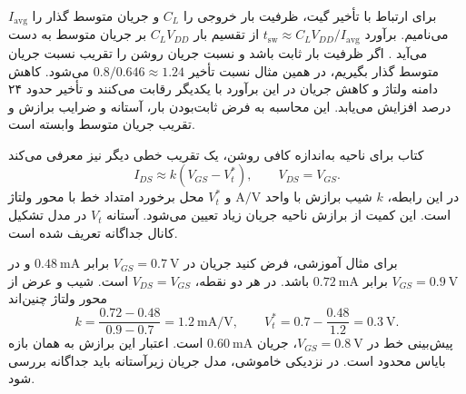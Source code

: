برای ارتباط با تأخیر گیت، ظرفیت بار خروجی را \(C_L\) و جریان متوسط
گذار را \(I_{\mathrm{avg}}\) می‌نامیم. برآورد
\(t_{\mathrm{sw}}\approx C_LV_{DD}/I_{\mathrm{avg}}\) از تقسیم بار
\(C_LV_{DD}\) بر جریان متوسط به دست می‌آید
\cite[بخش ]{weste}. اگر ظرفیت بار ثابت باشد و نسبت جریان
روشن را تقریب نسبت جریان متوسط گذار بگیریم، در همین مثال نسبت تأخیر
\(0.8/0.646\approx1.24\) می‌شود. کاهش دامنه ولتاژ و کاهش جریان در
این برآورد با یکدیگر رقابت می‌کنند و تأخیر حدود ۲۴ درصد افزایش می‌یابد.
این محاسبه به فرض ثابت‌بودن بار، آستانه و ضرایب برازش و تقریب جریان
متوسط وابسته است.

کتاب برای ناحیه به‌اندازه کافی روشن، یک تقریب خطی دیگر نیز معرفی می‌کند
\cite[رابطه  و شکل ]{weste}
\begin{equation}
 I_{DS}\approx k(V_{GS}-V_t^*),\qquad V_{DS}=V_{GS}.
 \label{eq:linear-on-fit}
\end{equation}
در این رابطه، \(k\) شیب برازش با واحد
\(\unit{\ampere\per\volt}\) و \(V_t^*\) محل برخورد امتداد خط با محور
ولتاژ است. این کمیت از برازش ناحیه جریان زیاد تعیین می‌شود.
آستانه \(V_t\) در مدل تشکیل کانال جداگانه تعریف شده است.

برای مثال آموزشی، فرض کنید جریان در \(V_{GS}=\qty{0.7}{\volt}\) برابر
\(\qty{0.48}{\milli\ampere}\) و در
\(V_{GS}=\qty{0.9}{\volt}\) برابر \(\qty{0.72}{\milli\ampere}\) باشد.
در هر دو نقطه، \(V_{DS}=V_{GS}\) است. شیب و عرض از محور ولتاژ چنین‌اند
\begin{equation*}
 k=\frac{0.72-0.48}{0.9-0.7}
 =\qty{1.2}{\milli\ampere\per\volt},\qquad
 V_t^*=0.7-\frac{0.48}{1.2}=\qty{0.3}{\volt}.
\end{equation*}
پیش‌بینی خط در \(V_{GS}=\qty{0.8}{\volt}\)، جریان
\(\qty{0.60}{\milli\ampere}\) است. اعتبار این برازش به همان بازه بایاس
محدود است. در نزدیکی خاموشی، مدل جریان زیرآستانه باید جداگانه بررسی شود.
